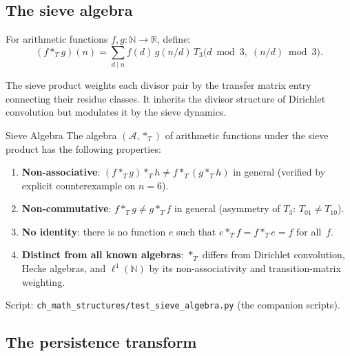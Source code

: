 \documentclass[12pt,a4paper]{article}
\begin{document}
\subsection{The sieve algebra}
\label{sec:ms_algebra}

\begin{definition}
\label{def:sieve_product}
For arithmetic functions $f, g\colon \mathbb{N} \to \mathbb{R}$,
define:
\begin{equation}
  (f *_T g)(n) = \sum_{d \mid n} f(d)\, g(n/d)\,
    T_3\bigl(d \bmod 3,\; (n/d) \bmod 3\bigr).
  \label{eq:sieve_product}
\end{equation}
\end{definition}

The sieve product weights each divisor pair by the transfer matrix
entry connecting their residue classes. It inherits the divisor
structure of Dirichlet convolution but modulates it by the
sieve dynamics.

\begin{thmbox}{Sieve Algebra}
\label{thm:sieve_algebra}
The algebra $(\mathcal{A}, *_T)$ of arithmetic functions under
the sieve product has the following properties:
\begin{enumerate}[nosep]
\item \textbf{Non-associative}: $(f *_T g) *_T h \neq f *_T (g *_T h)$
  in general (verified by explicit counterexample on $n = 6$).
\item \textbf{Non-commutative}: $f *_T g \neq g *_T f$ in general
  (asymmetry of $T_3$: $T_{01} \neq T_{10}$).
\item \textbf{No identity}: there is no function $e$ such that
  $e *_T f = f *_T e = f$ for all~$f$.
\item \textbf{Distinct from all known algebras}: $*_T$ differs from
  Dirichlet convolution, Hecke algebras, and $\ell^1(\mathbb{N})$
  by its non-associativity and transition-matrix weighting.
\end{enumerate}
Script: \texttt{ch\_math\_structures/test\_sieve\_algebra.py} (the companion scripts).
\end{thmbox}


\subsection{The persistence transform}
\label{sec:ms_transform}
\end{document}

